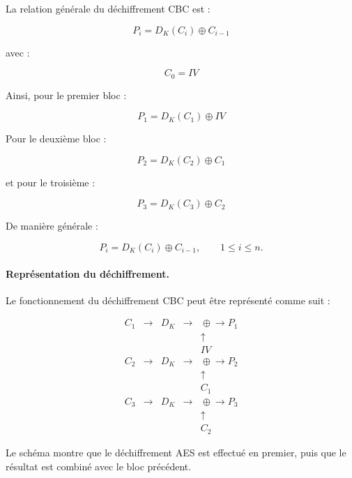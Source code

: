 \documentclass[12pt,a4paper]{article}
\begin{document}
La relation générale du déchiffrement CBC est :

\[
\boxed{
P_i=D_K(C_i)\oplus C_{i-1}
}
\]

avec :

\[
\boxed{
C_0=IV
}
\]

Ainsi, pour le premier bloc :

\[
\boxed{
P_1=D_K(C_1)\oplus IV
}
\]

Pour le deuxième bloc :

\[
\boxed{
P_2=D_K(C_2)\oplus C_1
}
\]

et pour le troisième :

\[
\boxed{
P_3=D_K(C_3)\oplus C_2
}
\]

De manière générale :

\[
\boxed{
P_i=D_K(C_i)\oplus C_{i-1},
\qquad 1\leq i\leq n.
}
\]



\paragraph{Représentation du déchiffrement.}

Le fonctionnement du déchiffrement CBC peut être représenté
comme suit :

\[
\begin{array}{ccccc}
C_1
&\longrightarrow&
\boxed{D_K}
&\longrightarrow&
\boxed{\oplus}
\longrightarrow P_1
\\
&&&&\uparrow
\\[-0.1cm]
&&&&IV
\\[0.8cm]

C_2
&\longrightarrow&
\boxed{D_K}
&\longrightarrow&
\boxed{\oplus}
\longrightarrow P_2
\\
&&&&\uparrow
\\[-0.1cm]
&&&&C_1
\\[0.8cm]

C_3
&\longrightarrow&
\boxed{D_K}
&\longrightarrow&
\boxed{\oplus}
\longrightarrow P_3
\\
&&&&\uparrow
\\[-0.1cm]
&&&&C_2
\end{array}
\]

Le schéma montre que le déchiffrement AES est effectué en premier,
puis que le résultat est combiné avec le bloc précédent.


\end{document}
